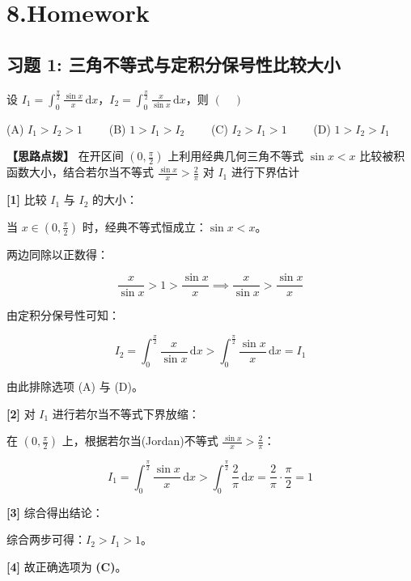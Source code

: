 \documentclass[11pt,a4paper,UTF8]{ctexart}
\begin{document}
\pagestyle{fancy}
\fancyhf{}
\fancyhead[R]{\small\color{TitlePurple}\nouppercase{\leftmark}}
\renewcommand{\headrulewidth}{0.5pt}

\tableofcontents
\newpage
{}


\section{8.Homework}


\subsection{习题 1: 三角不等式与定积分保号性比较大小}

设 $I_1 = \int_0^{\frac{\pi}{2}} \frac{\sin x}{x}\,\mathrm{d}x$，$I_2 = \int_0^{\frac{\pi}{2}} \frac{x}{\sin x}\,\mathrm{d}x$，则 $(\quad)$

(A) $I_1 > I_2 > 1 \qquad$ (B) $1 > I_1 > I_2 \qquad$ (C) $I_2 > I_1 > 1 \qquad$ (D) $1 > I_2 > I_1$

\textbf{\color{DeepPurple}【思路点拨】} 在开区间 $(0, \frac{\pi}{2})$ 上利用经典几何三角不等式 $\sin x < x$ 比较被积函数大小，结合若尔当不等式 $\frac{\sin x}{x} > \frac{2}{\pi}$ 对 $I_1$ 进行下界估计


\begin{solbox}[分步推导与答题规范]
\textbf{[1]} 比较 $I_1$ 与 $I_2$ 的大小：

当 $x \in (0, \frac{\pi}{2})$ 时，经典不等式恒成立：$\sin x < x$。

两边同除以正数得：


\begin{equation*}
\frac{x}{\sin x} > 1 > \frac{\sin x}{x} \implies \frac{x}{\sin x} > \frac{\sin x}{x}
\end{equation*}


由定积分保号性可知：


\begin{equation*}
I_2 = \int_0^{\frac{\pi}{2}} \frac{x}{\sin x}\,\mathrm{d}x > \int_0^{\frac{\pi}{2}} \frac{\sin x}{x}\,\mathrm{d}x = I_1
\end{equation*}


由此排除选项 (A) 与 (D)。

\textbf{[2]} 对 $I_1$ 进行若尔当不等式下界放缩：

在 $(0, \frac{\pi}{2})$ 上，根据若尔当(Jordan)不等式 $\frac{\sin x}{x} > \frac{2}{\pi}$：


\begin{equation*}
I_1 = \int_0^{\frac{\pi}{2}} \frac{\sin x}{x}\,\mathrm{d}x > \int_0^{\frac{\pi}{2}} \frac{2}{\pi}\,\mathrm{d}x = \frac{2}{\pi} \cdot \frac{\pi}{2} = 1
\end{equation*}


\textbf{[3]} 综合得出结论：

综合两步可得：$I_2 > I_1 > 1$。

\textbf{[4]} 故正确选项为 \textbf{(C)}。
\end{solbox}
\end{document}

